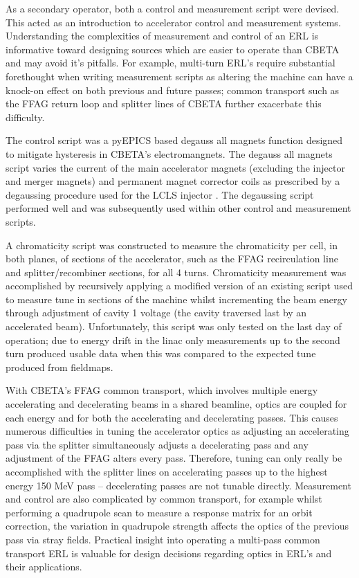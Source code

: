 \documentclass[10pt]{article}
\begin{document}
As a secondary operator, both a control and measurement script were devised. This acted as an introduction to accelerator control and measurement systems. Understanding the complexities of measurement and control of an ERL is informative toward designing sources which are easier to operate than CBETA and may avoid it's pitfalls. For example, multi-turn ERL's require substantial forethought when writing measurement scripts as altering the machine can have a knock-on effect on both previous and future passes; common transport such as the FFAG return loop and splitter lines of CBETA further exacerbate this difficulty.

The control script was a pyEPICS based degauss all magnets function designed to mitigate hysteresis in CBETA's electromangnets. The degauss all magnets script varies the current of the main accelerator magnets (excluding the injector and merger magnets) and permanent magnet corrector coils as prescribed by a degaussing procedure used for the LCLS injector \cite{weidemann2010degaussing}. The degaussing script performed well and was subsequently used within other control and measurement scripts. 

A chromaticity script was constructed to measure the chromaticity per cell, in both planes, of sections of the accelerator, such as the FFAG recirculation line and splitter/recombiner sections, for all 4 turns. Chromaticity measurement was accomplished by recursively applying a modified version of an existing script used to measure tune in sections of the machine whilst incrementing the beam energy through adjustment of cavity 1 voltage (the cavity traversed last by an accelerated beam). Unfortunately, this script was only tested on the last day of operation; due to energy drift in the linac only measurements up to the second turn produced usable data when this was compared to the expected tune produced from fieldmaps.

With CBETA's FFAG common transport, which involves multiple energy accelerating and decelerating beams in a shared beamline, optics are coupled for each energy and for both the accelerating and decelerating passes. This causes numerous difficulties in tuning the accelerator optics as adjusting an accelerating pass via the splitter simultaneously adjusts a decelerating pass and any adjustment of the FFAG alters every pass. Therefore, tuning can only really be accomplished with the splitter lines on accelerating passes up to the highest energy 150 MeV pass -- decelerating passes are not tunable directly. Measurement and control are also complicated by common transport, for example whilst performing a quadrupole scan to measure a response matrix for an orbit correction, the variation in quadrupole strength affects the optics of the previous pass via stray fields. Practical insight into operating a multi-pass common transport ERL is valuable for design decisions regarding optics in ERL's and their applications.
\end{document}
